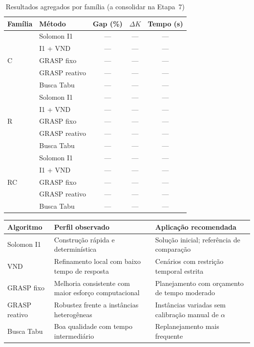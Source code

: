 \documentclass[10pt, a4paper]{article}
\begin{document}
\begin{table}[H]
\centering
\caption{Resultados agregados por fam\'ilia (a consolidar na Etapa~7)}
\label{tab:resultados}
\small
\begin{tabular}{|l|l|c|c|c|}
\hline
\rowcolor{gray!20}\textbf{Fam\'ilia} & \textbf{M\'etodo} & \textbf{Gap (\%)} & \textbf{$\Delta K$} & \textbf{Tempo (s)} \\
\hline
\multirow{5}{*}{C}
& Solomon I1     & --- & --- & --- \\
& I1 + VND       & --- & --- & --- \\
& GRASP fixo     & --- & --- & --- \\
& GRASP reativo  & --- & --- & --- \\
& Busca Tabu     & --- & --- & --- \\
\hline
\multirow{5}{*}{R}
& Solomon I1     & --- & --- & --- \\
& I1 + VND       & --- & --- & --- \\
& GRASP fixo     & --- & --- & --- \\
& GRASP reativo  & --- & --- & --- \\
& Busca Tabu     & --- & --- & --- \\
\hline
\multirow{5}{*}{RC}
& Solomon I1     & --- & --- & --- \\
& I1 + VND       & --- & --- & --- \\
& GRASP fixo     & --- & --- & --- \\
& GRASP reativo  & --- & --- & --- \\
& Busca Tabu     & --- & --- & --- \\
\hline
\end{tabular}
\end{table}

\begin{quadro}[H]
\centering
\caption{Perfil qualitativo dos algoritmos implementados}
\label{qdr-comparativo}
\small
\begin{tabular}{|p{30mm}|p{60mm}|p{55mm}|}
\hline
\rowcolor{gray!20}\textbf{Algoritmo} & \textbf{Perfil observado} & \textbf{Aplica\c{c}\~ao recomendada} \\
\hline
Solomon I1 & Constru\c{c}\~ao r\'apida e determin\'istica & Solu\c{c}\~ao inicial; refer\^encia de compara\c{c}\~ao \\
\hline
VND & Refinamento local com baixo tempo de resposta & Cen\'arios com restri\c{c}\~ao temporal estrita \\
\hline
GRASP fixo & Melhoria consistente com maior esfor\c{c}o computacional & Planejamento com or\c{c}amento de tempo moderado \\
\hline
GRASP reativo & Robustez frente a inst\^ancias heterog\^eneas & Inst\^ancias variadas sem calibra\c{c}\~ao manual de $\alpha$ \\
\hline
Busca Tabu & Boa qualidade com tempo intermedi\'ario & Replanejamento mais frequente \\
\hline
\end{tabular}
\end{quadro}
\end{document}
